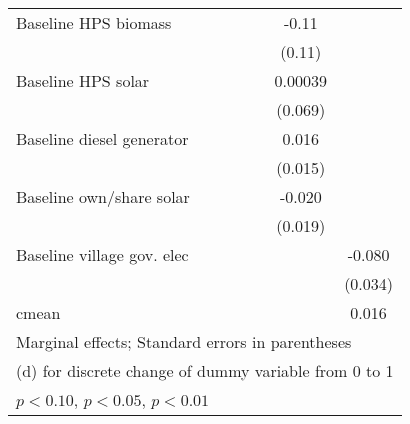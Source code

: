 \begin{table}[htbp]
\begin{tabular*}{1\hsize}{@{\hskip\tabcolsep\extracolsep\fill}l*{6}{c}}
Baseline HPS biomass&                  &                  &                  &                  &    -0.11         &                  \\
                &                  &                  &                  &                  &   (0.11)         &                  \\
Baseline HPS solar&                  &                  &                  &                  &  0.00039         &                  \\
                &                  &                  &                  &                  &  (0.069)         &                  \\
Baseline diesel generator&                  &                  &                  &                  &    0.016         &                  \\
                &                  &                  &                  &                  &  (0.015)         &                  \\
Baseline own/share solar&                  &                  &                  &                  &   -0.020         &                  \\
                &                  &                  &                  &                  &  (0.019)         &                  \\
Baseline village gov. elec&                  &                  &                  &                  &                  &   -0.080\sym{**} \\
                &                  &                  &                  &                  &                  &  (0.034)         \\
\midrule
cmean           &                  &                  &                  &                  &                  &    0.016         \\
\bottomrule
\multicolumn{7}{l}{\footnotesize Marginal effects; Standard errors in parentheses}\\
\multicolumn{7}{l}{\footnotesize  (d) for discrete change of dummy variable from 0 to 1}\\
\multicolumn{7}{l}{\footnotesize \sym{*} \(p<0.10\), \sym{**} \(p<0.05\), \sym{***} \(p<0.01\)}\\
\end{tabular*}
\end{table}
